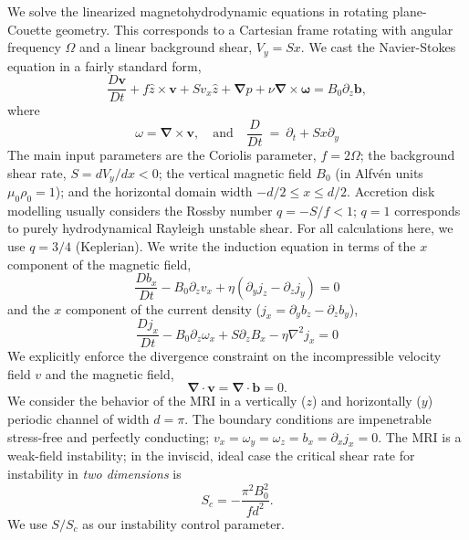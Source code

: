 \documentclass[aps,prl,reprint,superscriptaddress]{revtex4-1}
\newcommand{\SSC}{S/S_{c}}
\begin{document}
We solve the linearized magnetohydrodynamic equations in rotating plane-Couette geometry.
This corresponds to a Cartesian frame rotating with angular frequency $\Omega$ and a linear background shear, $V_{y} = Sx$. 
We cast the Navier-Stokes equation in a fairly standard form,
\begin{equation}
  \label{eq:mhd}
  \frac{D \mathbf{v}}{Dt} + f \hat{z} \times \mathbf{v} + S v_x \hat{z} + \mathbf{\nabla}{p} + \nu \mathbf{\nabla} \times \mathbf{\omega} = B_{0} \partial_{z} \mathbf{b},
\end{equation}
where
\begin{equation}
\omega = \mathbf{\nabla} \times \mathbf{v}, \quad \text{and} \quad \frac{D}{Dt} \ = \ \partial_{t} + S x \partial_{y}
\end{equation}
The main input parameters are the Coriolis parameter, $f = 2 \Omega$; the background shear rate, $S = dV_{y}/dx < 0$;  the vertical magnetic field $B_{0}$ (in Alfv\'{e}n units $\mu_{0} \rho_{0} = 1$); and the horizontal domain width $-d/2 \le x \le d/2$.
Accretion disk modelling usually considers the Rossby number $q = -S/f < 1$; $q=1$ corresponds to purely hydrodynamical Rayleigh unstable shear.
For all calculations here, we use $q = 3/4$ (Keplerian).
We write the induction equation in terms of the $x$ component of the magnetic field,
\begin{equation}
  \label{eq:Bx}
  \frac{D b_x}{Dt} - B_0 \partial_z v_x + \eta (\partial_y j_z - \partial_z j_y) = 0
\end{equation}
and the $x$ component of the current density ($j_{x} = \partial_{y}b_{z} - \partial_{z} b_{y}$),
\begin{equation}
  \label{eq:Jx}
  \frac{D j_x}{Dt} - B_0 \partial_z \omega_x + S \partial_z B_x - \eta \nabla^2 j_x = 0
\end{equation}
We explicitly enforce the divergence constraint on the incompressible velocity field $v$ and the magnetic field,
\begin{equation}
  \label{eq:divu}
  \mathbf{\nabla} \cdot \mathbf{v} = \mathbf{\nabla} \cdot \mathbf{b} = 0.
\end{equation}
We consider the behavior of the MRI in a vertically ($z$) and horizontally ($y$) periodic channel of width $d = \pi$. The boundary conditions are impenetrable stress-free and perfectly conducting; $v_{x} = \omega_{y} = \omega_{z} = b_{x} = \partial_{x}j_{x} = 0$. The MRI is a weak-field instability; in the inviscid, ideal case the critical shear rate for instability in \textit{two dimensions} is
\begin{equation}
  \label{eq:Sc}
  S_c = -\frac{\pi^2 B_{0}^2}{f d^2}.
\end{equation}
We use $\SSC$ as our instability control parameter. 
\end{document}
